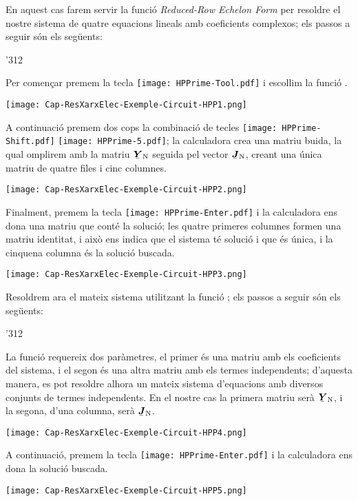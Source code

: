 \begin{exemple}
    En aquest cas farem servir la funció  \textit{Reduced-Row Echelon Form} per resoldre el nostre sistema de quatre equacions lineals amb coeficients complexos; els passos a seguir són els següents:

    \begin{dingautolist}{'312}
         \item Per començar premem la tecla \texttt{[image: HPPrime-Tool.pdf]} i escollim la funció .

             \texttt{[image: Cap-ResXarxElec-Exemple-Circuit-HPP1.png]}
         \item A continuació premem dos cops la combinació de tecles  \texttt{[image: HPPrime-Shift.pdf]} \texttt{[image: HPPrime-5.pdf]}; la calculadora crea una matriu buida, la qual omplirem amb la matriu $\mcmplx{Y}\ped{N}$ seguida pel vector $\mcmplx{J}\ped{N}$, creant una única matriu de quatre files i cinc columnes.

             \texttt{[image: Cap-ResXarxElec-Exemple-Circuit-HPP2.png]}

         \item Finalment, premem la tecla \texttt{[image: HPPrime-Enter.pdf]} i la calculadora ens dona una matriu que conté la solució; les quatre primeres columnes formen una matriu identitat, i això ens indica que el sistema té solució i que és única, i la cinquena columna és la  solució buscada.

         \texttt{[image: Cap-ResXarxElec-Exemple-Circuit-HPP3.png]}
    \end{dingautolist}

    Resoldrem ara el mateix sistema utilitzant  la funció ; els passos a seguir són els següents:

    \begin{dingautolist}{'312}
         \item La funció  requereix dos paràmetres, el primer és una matriu amb els coeficients del sistema, i el segon és una altra matriu amb els termes independents; d'aquesta manera, es pot resoldre alhora un mateix sistema d'equacions amb diversos conjunts de termes independents. En el nostre cas la primera matriu serà $\mcmplx{Y}\ped{N}$, i la segona, d'una columna, serà  $\mcmplx{J}\ped{N}$.

             \texttt{[image: Cap-ResXarxElec-Exemple-Circuit-HPP4.png]}

         \item A continuació, premem la tecla \texttt{[image: HPPrime-Enter.pdf]} i la calculadora ens dona la  solució buscada.

         \texttt{[image: Cap-ResXarxElec-Exemple-Circuit-HPP5.png]}
    \end{dingautolist}
\end{exemple}


